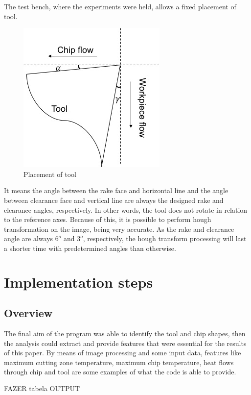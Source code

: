 	The test bench, where the experiments were held, allows a fixed placement of tool.

	\begin{figure}[H]
		\centering
		\captionsetup{justification=centering}
		\includegraphics[scale = 0.65]{Cap4/imgset.jpg}
		\caption{Placement of tool}
		\label{fig:imgset}
	\end{figure}

	It means the angle between the rake face and horizontal line and the angle between clearance face and vertical line are always the designed rake and clearance angles, respectively. In other words, the tool does not rotate in relation to the reference axes. Because of this, it is possible to perform hough transformation on the image, being very accurate. As the rake and clearance angle are always $6^{o}$ and $3^{o}$, respectively, the hough transform processing will last a shorter time with predetermined angles than otherwise.

\section{Implementation steps}
	\subsection{Overview}	

	The final aim of the program was able to identify the tool and chip shapes, then the analysis could extract and provide features that were essential for the results of this paper. By means of image processing and some input data, features like maximum cutting zone temperature, maximum chip temperature, heat flows through chip and tool are some examples of what the code is able to provide.	

	FAZER tabela OUTPUT
